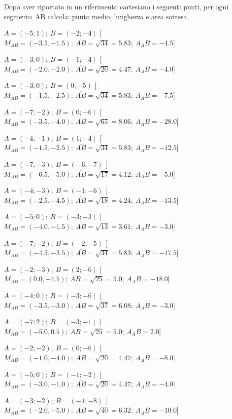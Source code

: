 \subsubsection*{}

\begin{esercizio}\label{ese:03.1}
Dopo aver riportato in un riferimento cartesiano i seguenti punti,
per ogni segmento~AB calcola: punto medio, lunghezza e area sottesa.
 \begin{enumeratea}
  \item $ A=(-5; 1); ~B=(-2; -4)$ \hfill 
  [$M_{AB}=(-3.5, -1.5); ~\overline{AB}=\sqrt{34}=5.83; ~A_AB=-4.5$]
  \item $ A=(-3; 0); ~B=(-1; -4)$ \hfill 
  [$M_{AB}=(-2.0, -2.0); ~\overline{AB}=\sqrt{20}=4.47; ~A_AB=-4.0$]
  \item $ A=(-3; 0); ~B=(0; -5)$ \hfill 
  [$M_{AB}=(-1.5, -2.5); ~\overline{AB}=\sqrt{34}=5.83; ~A_AB=-7.5$]
  \item $ A=(-7; -2); ~B=(0; -6)$ \hfill 
  [$M_{AB}=(-3.5, -4.0); ~\overline{AB}=\sqrt{65}=8.06; ~A_AB=-28.0$]
  \item $ A=(-4; -1); ~B=(1; -4)$ \hfill 
  [$M_{AB}=(-1.5, -2.5); ~\overline{AB}=\sqrt{34}=5.83; ~A_AB=-12.5$]
  \item $ A=(-7; -3); ~B=(-6; -7)$ \hfill 
  [$M_{AB}=(-6.5, -5.0); ~\overline{AB}=\sqrt{17}=4.12; ~A_AB=-5.0$]
  \item $ A=(-4; -3); ~B=(-1; -6)$ \hfill 
  [$M_{AB}=(-2.5, -4.5); ~\overline{AB}=\sqrt{18}=4.24; ~A_AB=-13.5$]
  \item $ A=(-5; 0); ~B=(-3; -3)$ \hfill 
  [$M_{AB}=(-4.0, -1.5); ~\overline{AB}=\sqrt{13}=3.61; ~A_AB=-3.0$]
  \item $ A=(-7; -2); ~B=(-2; -5)$ \hfill 
  [$M_{AB}=(-4.5, -3.5); ~\overline{AB}=\sqrt{34}=5.83; ~A_AB=-17.5$]
  \item $ A=(-2; -3); ~B=(2; -6)$ \hfill 
  [$M_{AB}=(0.0, -4.5); ~\overline{AB}=\sqrt{25}=5.0; ~A_AB=-18.0$]
  \item $ A=(-4; 0); ~B=(-3; -6)$ \hfill 
  [$M_{AB}=(-3.5, -3.0); ~\overline{AB}=\sqrt{37}=6.08; ~A_AB=-3.0$]
  \item $ A=(-7; 2); ~B=(-3; -1)$ \hfill 
  [$M_{AB}=(-5.0, 0.5); ~\overline{AB}=\sqrt{25}=5.0; ~A_AB=2.0$]
  \item $ A=(-2; -2); ~B=(0; -6)$ \hfill 
  [$M_{AB}=(-1.0, -4.0); ~\overline{AB}=\sqrt{20}=4.47; ~A_AB=-8.0$]
  \item $ A=(-5; 0); ~B=(-1; -2)$ \hfill 
  [$M_{AB}=(-3.0, -1.0); ~\overline{AB}=\sqrt{20}=4.47; ~A_AB=-4.0$]
  \item $ A=(-3; -2); ~B=(-1; -8)$ \hfill 
  [$M_{AB}=(-2.0, -5.0); ~\overline{AB}=\sqrt{40}=6.32; ~A_AB=-10.0$]
 \end{enumeratea}
\end{esercizio}


